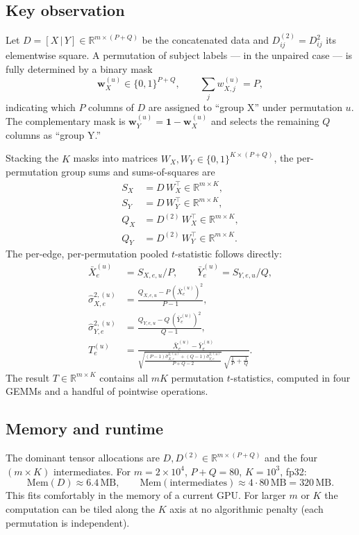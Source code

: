 \documentclass[11pt]{article}
\begin{document}
\subsection{Key observation}

Let $D = [X \,|\, Y] \in \mathbb{R}^{m \times (P+Q)}$ be the concatenated data and $D^{(2)}_{ij} = D_{ij}^2$ its elementwise square. A permutation of subject labels --- in the unpaired case --- is fully determined by a binary mask
%
\[
\mathbf{w}_X^{(u)} \in \{0,1\}^{P+Q}, \qquad \sum_j w_{X,j}^{(u)} = P,
\]
%
indicating which $P$ columns of $D$ are assigned to ``group X'' under permutation $u$. The complementary mask is $\mathbf{w}_Y^{(u)} = \mathbf{1} - \mathbf{w}_X^{(u)}$ and selects the remaining $Q$ columns as ``group Y.''

Stacking the $K$ masks into matrices $W_X, W_Y \in \{0,1\}^{K \times (P+Q)}$, the per-permutation group sums and sums-of-squares are
%
\begin{align}
S_X &= D \, W_X^{\top} \in \mathbb{R}^{m\times K},\\
S_Y &= D \, W_Y^{\top} \in \mathbb{R}^{m\times K},\\
Q_X &= D^{(2)}\, W_X^{\top} \in \mathbb{R}^{m\times K},\\
Q_Y &= D^{(2)}\, W_Y^{\top} \in \mathbb{R}^{m\times K}.
\end{align}
%
The per-edge, per-permutation pooled $t$-statistic follows directly:
%
\begin{align}
\bar X^{(u)}_e &= S_{X,e,u}/P, \qquad \bar Y^{(u)}_e = S_{Y,e,u}/Q,\\
\hat\sigma^{2,(u)}_{X,e} &= \frac{Q_{X,e,u} - P\,(\bar X^{(u)}_e)^2}{P-1},\\
\hat\sigma^{2,(u)}_{Y,e} &= \frac{Q_{Y,e,u} - Q\,(\bar Y^{(u)}_e)^2}{Q-1},\\
T^{(u)}_e &= \frac{\bar X^{(u)}_e - \bar Y^{(u)}_e}{\sqrt{\frac{(P-1)\hat\sigma^{2,(u)}_{X,e} + (Q-1)\hat\sigma^{2,(u)}_{Y,e}}{P+Q-2}}\;\sqrt{\tfrac1P + \tfrac1Q}}.
\end{align}
%
The result $T \in \mathbb{R}^{m\times K}$ contains all $mK$ permutation $t$-statistics, computed in four GEMMs and a handful of pointwise operations.

\subsection{Memory and runtime}

The dominant tensor allocations are $D, D^{(2)} \in \mathbb{R}^{m\times(P+Q)}$ and the four $(m\times K)$ intermediates. For $m = 2\times10^4$, $P+Q=80$, $K=10^3$, fp32:
%
\[
\mathrm{Mem}(D) \approx 6.4\,\mathrm{MB}, \qquad \mathrm{Mem}(\text{intermediates}) \approx 4 \cdot 80\,\mathrm{MB} = 320\,\mathrm{MB}.
\]
%
This fits comfortably in the memory of a current GPU. For larger $m$ or $K$ the computation can be tiled along the $K$ axis at no algorithmic penalty (each permutation is independent).
\end{document}
